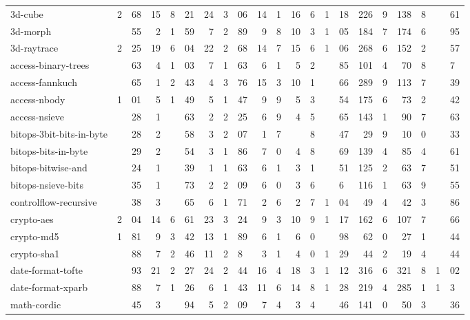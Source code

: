 \begin{figure*}
\begin{center}
\begin{tabular}{|l|r@{.}lr|r@{.}lr|r@{.}l|r@{.}lr@{.}l|r@{.}l|r@{.}lr@{.}l|r@{.}l|}
3d-cube                  & 2&68 & 15 & 8&21 & 24 & 3&06
    & 14&1 & 16&6 & 1&18 & 226&9 & 138&8 & &61 \\
3d-morph                 & &55 & 2   & 1&59 & 7  & 2&89 
    & 9&8  & 10&3 & 1&05 & 184&7 & 174&6 & &95 \\
3d-raytrace              & 2&25 & 19 & 6&04 & 22 & 2&68
    & 14&7 & 15&6 & 1&06 & 268&6 & 152&2 & &57 \\
access-binary-trees      & &63 & 4   & 1&03 & 7  & 1&63
    & 6&1  & 5&2 & &85   & 101&4 & 70&8  & &7 \\
access-fannkuch          & &65  & 1  & 2&43 & 4  & 3&76
    & 15&3 & 10&1 & &66  & 289&9 & 113&7 & &39 \\
access-nbody             & 1&01 & 5  & 1&49 & 5  & 1&47
    & 9&9  & 5&3 & &54   & 175&6 & 73&2  & &42 \\
access-nsieve            & &28 & 1   & &63 & 2   & 2&25
    & 6&9  & 4&5 & &65   & 143&1 & 90&7  & &63 \\
bitops-3bit-bits-in-byte & &28 & 2   & &58 & 3   & 2&07
    & 1&7  & &8 & &47    & 29&9 & 10&0   & &33 \\
bitops-bits-in-byte      & &29 & 2   & &54 & 3   & 1&86
    & 7&0  & 4&8 & &69   & 139&4 & 85&4  & &61 \\
bitops-bitwise-and       & &24 & 1   & &39 & 1   & 1&63
    & 6&1  & 3&1 & &51   & 125&2 & 63&7  & &51 \\
bitops-nsieve-bits       & &35 & 1   & &73 & 2   & 2&09
    & 6&0  & 3&6 & &6    & 116&1 & 63&9  & &55 \\
controlflow-recursive    & &38 & 3   & &65 & 6   & 1&71
    & 2&6  & 2&7 & 1&04  & 49&4  & 42&3  & &86 \\
crypto-aes               & 2&04 & 14 & 6&61 & 23 & 3&24
    & 9&3  & 10&9 & 1&17 & 162&6 & 107&7 & &66 \\
crypto-md5               & 1&81 & 9  & 3&42 & 13 & 1&89
    & 6&1  & 6&0 & &98   & 62&0  & 27&1  & &44 \\
crypto-sha1              & &88 & 7   & 2&46 & 11 & 2&8
    & 3&1  & 4&0 & 1&29  & 44&2  & 19&4  & &44 \\
date-format-tofte        & &93 & 21  & 2&27 & 24 & 2&44
    & 16&4 & 18&3 & 1&12 & 316&6 & 321&8 & 1&02 \\
date-format-xparb        & &88 & 7   & 1&26 & 6  & 1&43
    & 11&6 & 14&8 & 1&28 & 219&4 & 285&1 & 1&3 \\
math-cordic              & &45 & 3   & &94 & 5   & 2&09
    & 7&4  & 3&4 & &46   & 141&0 & 50&3  & &36 \\

\end{tabular}
\end{center}
\end{figure*}
